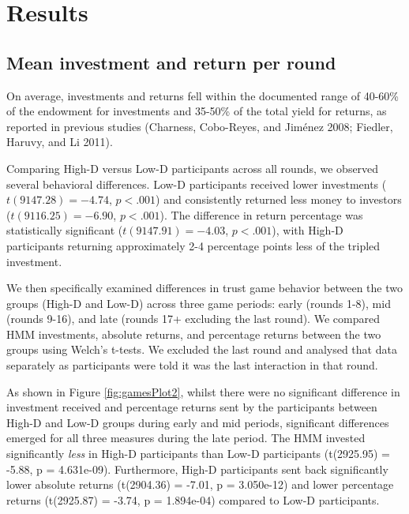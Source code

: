 \documentclass[
]{article}
\begin{document}
\section{Results}\label{results}

\subsection{Mean investment and return per round}\label{mean-investment-and-return-per-round}

On average, investments and returns fell within the documented range of 40-60\% of the endowment for investments and 35-50\% of the total yield for returns, as reported in previous studies (Charness, Cobo-Reyes, and Jiménez 2008; Fiedler, Haruvy, and Li 2011).

Comparing High-D versus Low-D participants across all rounds, we observed several behavioral differences. Low-D participants received lower investments (\(t(9147.28) = -4.74\), \(p < .001\)) and consistently returned less money to investors (\(t(9116.25) = -6.90\), \(p < .001\)). The difference in return percentage was statistically significant (\(t(9147.91) = -4.03\), \(p < .001\)), with High-D participants returning approximately 2-4 percentage points less of the tripled investment.

We then specifically examined differences in trust game behavior between the two groups (High-D and Low-D) across three game periods: early (rounds 1-8), mid (rounds 9-16), and late (rounds 17+ excluding the last round). We compared HMM investments, absolute returns, and percentage returns between the two groups using Welch's t-tests. We excluded the last round and analysed that data separately as participants were told it was the last interaction in that round.

As shown in Figure \ref{fig:gamesPlot2}, whilst there were no significant difference in investment received and percentage returns sent by the participants between High-D and Low-D groups during early and mid periods, significant differences emerged for all three measures during the late period. The HMM invested significantly \emph{less} in High-D participants than Low-D participants (t(2925.95) = -5.88, p = 4.631e-09). Furthermore, High-D participants sent back significantly lower absolute returns (t(2904.36) = -7.01, p = 3.050e-12) and lower percentage returns (t(2925.87) = -3.74, p = 1.894e-04) compared to Low-D participants.
\end{document}
